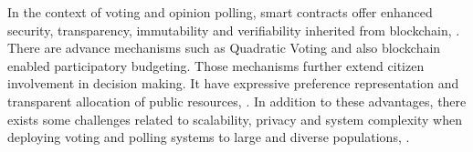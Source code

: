 
In the context of voting and opinion polling, smart contracts offer enhanced security, transparency, immutability and verifiability inherited from blockchain\cite{ResearchGate_2024_ScalableEVoting}, \cite{IEEE_2024_BPVot}. There are advance mechanisms such as Quadratic Voting and also blockchain enabled participatory budgeting. Those mechanisms further extend citizen involvement in decision making. It have expressive preference representation and transparent allocation of public resources\cite{ResearchGate_2021_QuadraticVoting}, \cite{UPSpace_2022_ParticipatoryBudgeting}. In addition to these advantages, there exists some challenges related to scalability, privacy and system complexity when deploying voting and polling systems to large and diverse populations\cite{ResearchGate_2024_ScalableEVoting}, \cite{JournalOfCybersecurity_2020_BlockchainVoting}.


